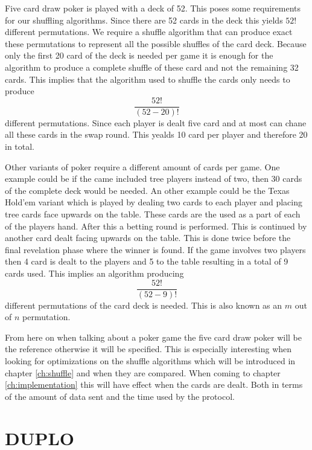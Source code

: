 \documentclass[twoside,11pt,openright]{report}
\begin{document}
Five card draw poker is played with a deck of 52. This poses some requirements for our shuffling algorithms. Since there are 52 cards in the deck this yields $52!$ different permutations. We require a shuffle algorithm that can produce exact these permutations to represent all the possible shuffles of the card deck. Because only the first 20 card of the deck is needed per game it is enough for the algorithm to produce a complete shuffle of these card and not the remaining 32 cards. This implies that the algorithm used to shuffle the cards only needs to produce $$\frac{52!}{(52-20)!}$$ different permutations. Since each player is dealt five card and at most can chane all these cards in the swap round. This yealds 10 card per player and therefore 20 in total.

Other variants of poker require a different amount of cards per game. One example could be if the came included tree players instead of two, then 30 cards of the complete deck would be needed. An other example could be the Texas Hold'em variant which is played by dealing two cards to each player and placing tree cards face upwards on the table. These cards are the used as a part of each of the players hand. After this a betting round is performed. This is continued by another card dealt facing upwards on the table. This is done twice before the final revelation phase where the winner is found. If the game involves two players then 4 card is dealt to the players and 5 to the table resulting in a total of 9 cards used. This implies an algorithm producing $$\frac{52!}{(52-9)!}$$ different permutations of the card deck is needed. This is also known as an $m$ out of $n$ permutation.

From here on when talking about a poker game the five card draw poker will be the reference otherwise it will be specified. This is especially interesting when looking for optimizations on the shuffle algorithms which will be introduced in chapter \ref{ch:shuffle} and when they are compared. When coming to chapter \ref{ch:implementation} this will have effect when the cards are dealt. Both in terms of the amount of data sent and the time used by the protocol.


\chapter{DUPLO}
\label{ch:duplo}
\end{document}
